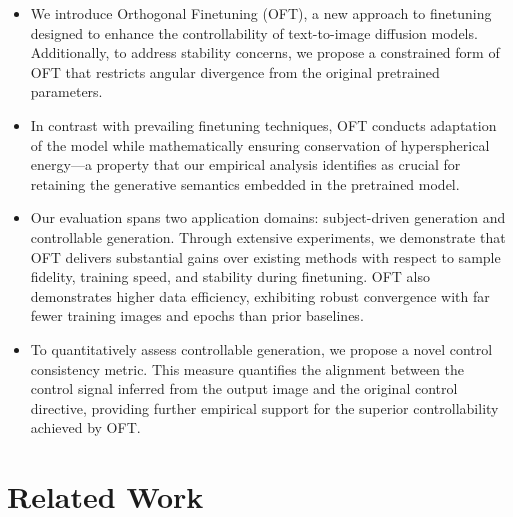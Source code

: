 \begin{itemize}[leftmargin=*,nosep]

    \item We introduce Orthogonal Finetuning (OFT), a new approach to finetuning designed to enhance the controllability of text-to-image diffusion models. Additionally, to address stability concerns, we propose a constrained form of OFT that restricts angular divergence from the original pretrained parameters.
    \item In contrast with prevailing finetuning techniques, OFT conducts adaptation of the model while mathematically ensuring conservation of hyperspherical energy—a property that our empirical analysis identifies as crucial for retaining the generative semantics embedded in the pretrained model.
    \item Our evaluation spans two application domains: subject-driven generation and controllable generation. Through extensive experiments, we demonstrate that OFT delivers substantial gains over existing methods with respect to sample fidelity, training speed, and stability during finetuning. OFT also demonstrates higher data efficiency, exhibiting robust convergence with far fewer training images and epochs than prior baselines.
    \item To quantitatively assess controllable generation, we propose a novel control consistency metric. This measure quantifies the alignment between the control signal inferred from the output image and the original control directive, providing further empirical support for the superior controllability achieved by OFT.
\end{itemize}

\section{Related Work}

